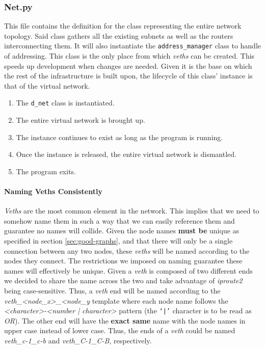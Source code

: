 \subsubsection{Net.py}
    This file contains the definition for the class representing the entire network topology. Said class gathers all the existing subnets as well as the routers interconnecting them. It will also instantiate the \texttt{address\_manager} class to handle of addressing. This class is the only place from which \textit{veths} can be created. This speeds up development when changes are needed. Given it is the base on which the rest of the infrastructure is built upon, the lifecycle of this class' instance is that of the virtual network.\\

    \begin{enumerate}
        \item The \texttt{d\_net} class is instantiated.
        \item The entire virtual network is brought up.
        \item The instance continues to exist as long as the program is running.
        \item Once the instance is released, the entire virtual network is dismantled.
        \item The program exits.
    \end{enumerate}

    \paragraph{Naming Veths Consistently}
        \textit{Veths} are the most common element in the network. This implies that we need to somehow name them in such a way that we can easily reference them and guarantee no names will collide. Given the node names \textbf{must be} unique as specified in section \ref{sec:good-graphs}, and that there will only be a single connection between any two nodes, these \textit{veths} will be named according to the nodes they connect. The restrictions we imposed on naming guarantee these names will effectively be unique. Given a \textit{veth} is composed of two different ends we decided to share the name across the two and take advantage of \textit{iproute2} being case-sensitive. Thus, a \textit{veth} end will be named according to the \textit{veth\_<node\_x>\_<node\_y} template where each node name follows the \textit{<character>-<number | character>} pattern (the \texttt{`|'} character is to be read as \textit{OR}). The other end will have the \textbf{exact same} name with the node names in upper case instead of lower case. Thus, the ends of a \textit{veth} could be named \textit{veth\_c-1\_c-b} and \textit{veth\_C-1\_C-B}, respectively.


